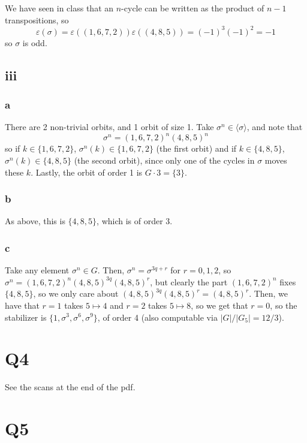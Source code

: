 \documentclass[12pt,letterpaper]{article}
\theoremstyle{definition}
\begin{document}
We have seen in class that an $n$-cycle can be written as the product of $n - 1$ transpositions, so
\[
  \varepsilon(\sigma) = \varepsilon((1,6,7,2))\varepsilon((4,8,5)) = (-1)^{3}(-1)^{2} = -1
\]
so $\sigma$ is odd.

\subsection*{iii}
\subsubsection*{a}

There are 2 non-trivial orbits, and 1 orbit of size 1. Take $\sigma^{n} \in \langle \sigma \rangle$, and note that
\[
  \sigma^{n} = (1,6,7,2)^{n}(4,8,5)^{n}
\]
so if $k \in \{1,6,7,2\}$, $\sigma^{n}(k) \in \{1,6,7,2\}$ (the first orbit) and if $k \in \{4,8,5\}$, $\sigma^{n}(k) \in \{4,8,5\}$ (the second orbit), since only one of the cycles in $\sigma$ moves these $k$. Lastly, the orbit of order 1 is $G \cdot 3 = \{3\}$.

\subsubsection*{b}

As above, this is $\{4,8,5\}$, which is of order 3.

\subsubsection*{c}

Take any element $\sigma^{n} \in G$. Then, $\sigma^{n} = \sigma^{3q + r}$ for $r = 0, 1, 2$, so $\sigma^{n} = (1,6,7,2)^{n}(4,8,5)^{3q}(4,8,5)^{r}$, but clearly the part $(1,6,7,2)^{n}$ fixes $\{4,8,5\}$, so we only care about $(4,8,5)^{3q}(4,8,5)^{r} = (4,8,5)^{r}$. Then, we have that $r = 1$ takes $5 \mapsto 4$ and $r = 2$ takes $5 \mapsto 8$, so we get that $r = 0$, so the stabilizer is $\{1, \sigma^{3}, \sigma^{6}, \sigma^{9}\}$, of order 4 (also computable via $|G|/|G_{5}| = 12/3$).

\section*{Q4}

See the scans at the end of the pdf.

\section*{Q5}
\end{document}
